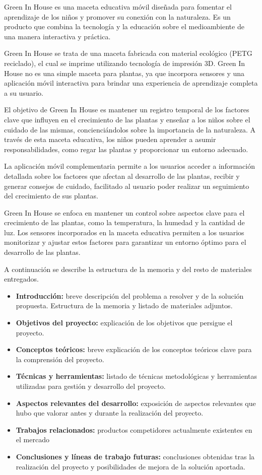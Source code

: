 
Green In House es una maceta educativa móvil diseñada para fomentar el aprendizaje de los niños y promover su conexión con la naturaleza. Es un producto que combina la tecnología y la educación sobre el medioambiente de una manera interactiva y práctica.

Green In House se trata de una maceta fabricada con material ecológico (PETG reciclado), el cual se imprime utilizando tecnología de impresión 3D. Green In House no es una simple maceta para plantas, ya que incorpora sensores y una aplicación móvil interactiva para brindar una experiencia de aprendizaje completa a su usuario.

El objetivo de Green In House es mantener un registro temporal de los factores clave que influyen en el crecimiento de las plantas y enseñar a los niños sobre el cuidado de las mismas, concienciándolos sobre la importancia de la naturaleza. A través de esta maceta educativa, los niños pueden aprender a asumir responsabilidades, como regar las plantas y proporcionar un entorno adecuado.

La aplicación móvil complementaria permite a los usuarios acceder a información detallada sobre los factores que afectan al desarrollo de las plantas, recibir y generar consejos de cuidado, facilitado al usuario poder realizar un seguimiento del crecimiento de sus plantas. 

Green In House se enfoca en mantener un control sobre aspectos clave para el crecimiento de las plantas, como la temperatura, la humedad y la cantidad de luz. Los sensores incorporados en la maceta educativa permiten a los usuarios monitorizar y ajustar estos factores para garantizar un entorno óptimo para el desarrollo de las plantas.

A continuación se describe la estructura de la memoria y del resto de materiales entregados.
\begin{itemize}
  \item \textbf{Introducción:} breve descripción del problema a resolver y de la solución propuesta. Estructura de la memoria y listado de materiales adjuntos.
  \item \textbf{Objetivos del proyecto:} explicación de los objetivos que persigue el proyecto.
  \item \textbf{Conceptos teóricos:} breve explicación de los conceptos teóricos clave para la comprensión del proyecto.
  \item \textbf{Técnicas y herramientas:} listado de técnicas metodológicas y herramientas utilizadas para gestión y desarrollo del proyecto.
  \item \textbf{Aspectos relevantes del desarrollo:} exposición de aspectos relevantes que hubo que valorar antes y durante la realización del proyecto.
  \item \textbf{Trabajos relacionados:} productos competidores actualmente existentes en el mercado
  \item \textbf{Conclusiones y líneas de trabajo futuras:} conclusiones obtenidas tras la realización del proyecto y posibilidades de mejora de la solución aportada.
\end{itemize}

